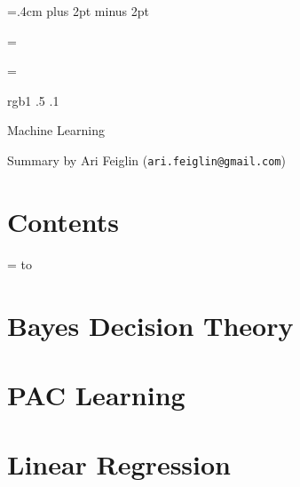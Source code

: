 

\parindent=.4cm
\parskip=3pt plus 2pt minus 2pt



\footline={}


\headline={}

\color rgb{1 .5 .1}

{\def\boxshadowcolor{rgb{.8 .6 0}}

    \centerline{Machine Learning}
    \smallskip
    \centerline{Summary by Ari Feiglin ({\tt ari.feiglin@gmail.com})}

\eppbox

\bigskip

    \section*{Contents}
    
    \tableofcontents
\eppbox

}

\vfill\break

\color{black}

\newif\ifpageodd
\pageoddtrue
\headline={%
    \hbox to \hsize{\color{black}%
        \ifpageodd\hfil{\it\currsubsection\quad\bf\folio}\global\pageoddfalse%
        \else{\bf\folio\quad\it\currsubsection}\hfil\global\pageoddtrue\fi%
    }%
}

\section{Bayes Decision Theory}



\vfill\break

\section{PAC Learning}



\vfill

\section{Linear Regression}



\bye


